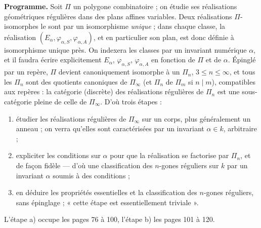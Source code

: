 \documentclass[11pt,a4paper]{article}
\begin{document}
\textbf{Programme.} Soit $\Pi$ un polygone combinatoire ; on étudie ses
réalisations géométriques régulières dans des plans affines variables. Deux
réalisations $\Pi$-isomorphes le sont par un isomorphisme \emph{unique} ; dans
chaque classe, la réalisation $(E_\alpha, \varphi_{\alpha,S},
\varphi_{\alpha,A})$, et en particulier son plan, est donc définie à
isomorphisme unique près. On indexera les classes par un invariant numérique
$\alpha$, et il faudra écrire explicitement $E_\alpha$, $\varphi_{\alpha,S}$,
$\varphi_{\alpha,A}$ en fonction de $\Pi$ et de $\alpha$. Épinglé par un
repère, $\Pi$ devient canoniquement isomorphe à un $\Pi_n$, $3 \leq n \leq
\infty$, et tous les $\Pi_n$ sont des quotients canoniques de $\Pi_\infty$ (et
$\Pi_n$ de $\Pi_m$ si $n \mid m$), compatibles aux repères : la catégorie
(discrète) des réalisations régulières de $\Pi_n$ est une sous-catégorie pleine
de celle de $\Pi_\infty$. D'où trois étapes :
\begin{enumerate}
  \item[a)] étudier les réalisations régulières de $\Pi_\infty$ sur un corps,
    plus généralement un anneau ; on verra qu'elles sont caractérisées par un
    invariant $\alpha \in k$, arbitraire ;
  \item[b)] expliciter les conditions sur $\alpha$ pour que la réalisation se
    factorise par $\Pi_n$, et de façon fidèle --- d'où une classification des
    $n$-gones réguliers sur $k$ par un invariant $\alpha$ soumis à des
    conditions ;
  \item[c)] en déduire les propriétés essentielles et la classification des
    $n$-gones réguliers, sans épinglage ; « cette étape est essentiellement
    triviale ».
\end{enumerate}
L'étape a) occupe les pages 76 à 100, l'étape b) les pages 101 à 120.
\end{document}
